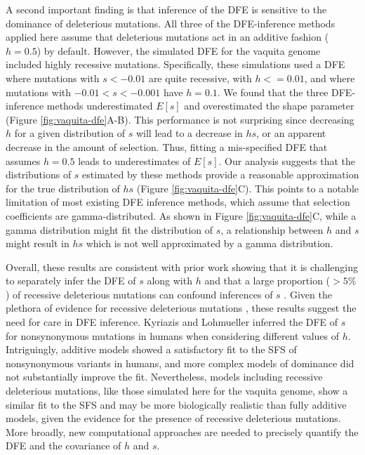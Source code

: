 \documentclass[hidelinks]{article}
\begin{document}
    A second important finding is that inference of the DFE
    is sensitive to the dominance of deleterious mutations.
    All three of the DFE-inference methods applied here assume that deleterious mutations act
    in an additive fashion ($h=0.5$) by default.
    However, the simulated DFE for the vaquita genome included highly recessive mutations.
    Specifically, these simulations used a DFE where mutations with $s<-0.01$ are quite recessive,
    with $h<=0.01$, and where mutations with $-0.01<s<-0.001$ have $h=0.1$.
    We found that the three DFE-inference methods underestimated $E[s]$ and overestimated the shape parameter (Figure \ref{fig:vaquita-dfe}A-B).
    This performance is not surprising since decreasing $h$ for a given distribution of $s$ will lead to a decrease in $hs$,
    or an apparent decrease in the amount of selection.
    Thus, fitting a mis-specified DFE that assumes $h=0.5$ leads to underestimates of $E[s]$. 
    Our analysis suggests that the distributions of $s$ estimated by these methods
    provide a reasonable approximation for the true distribution of $hs$ (Figure \ref{fig:vaquita-dfe}C).
    This points to a notable limitation of most existing DFE inference methods,
    which assume that selection coefficients are gamma-distributed.
    As shown in Figure \ref{fig:vaquita-dfe}C,
    while a gamma distribution might fit the distribution of $s$, a relationship between $h$ and $s$ might result in
    $hs$ which is not well approximated by a gamma distribution.
    
    Overall, these results are consistent with prior work showing that it is challenging to separately
    infer the DFE of $s$ along with $h$ \citep{veeramah2014evidence, kyriazis2024constraining, balick2022overcoming} 
    and that a large proportion ($>5\%$) of recessive deleterious mutations can confound inferences of $s$ \citep{wade2023quantifying}.
    Given the plethora of evidence for recessive deleterious mutations
    \citep{mukai1972mutation, agrawal2011inferences, huber2018gene, di2024revisiting},
    these results suggest the need for care in DFE inference.
    Kyriazis and Lohmueller \citeyear{kyriazis2024constraining} inferred the DFE of $s$ for nonsynonymous mutations
    in humans when considering different values of $h$.
    Intriguingly, additive models showed a satisfactory fit to the SFS of nonsynonymous variants in humans,
    and more complex models of dominance did not substantially improve the fit.
    Nevertheless, models including recessive deleterious mutations, like those simulated here for the vaquita genome,
    show a similar fit to the SFS and may be more biologically realistic than fully additive models, 
    given the evidence for the presence of recessive deleterious mutations.
    More broadly, new computational approaches are needed to precisely quantify the DFE and the covariance of $h$ and $s$.
\end{document}
